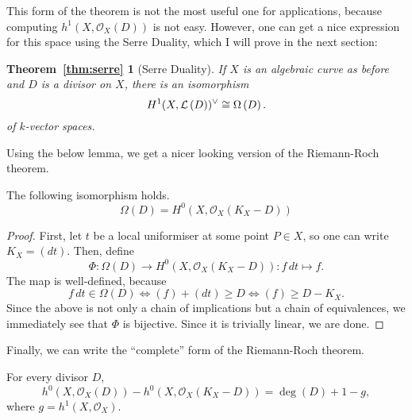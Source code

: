 This form of the theorem is not the most useful one for applications,
because computing $h^{1}(X,\mathscr{O}_X(D))$ is not easy. However, one can
get a nice expression for this space using the Serre Duality, which
I will prove in the next section:
\newtheorem*{thm:serre}{Theorem~\ref{thm:serre}}
\begin{thm:serre}[Serre Duality]
  If $X$ is an algebraic curve as before
  and $D$ is a divisor on $X$, there is an isomorphism
  \[
    H^1(X,\mathcal{L}\left(D\right))^{\vee}\cong \Omega\left(D\right).
  \]
  of $k$-vector spaces.
\end{thm:serre}
Using the below lemma, we get a nicer looking version of the Riemann-Roch theorem.
\begin{lemm}\label{lemm:diffs_dim}
  The following isomorphism holds.
  \[\Omega(D)=H^{0}(X,\mathscr{O}_X(K_{X}-D))\]
\end{lemm}
\begin{proof}
  First, let $t$ be a local uniformiser at some point $P\in X$, so
  one can write $K_{X}=(dt)$. Then, define
  \[
    \Phi\colon\Omega(D)\to H^{0}(X,\mathscr{O}_{X}(K_{X}-D)):f\,dt\mapsto f.
  \]
  The map is well-defined, because
  \[
    f\,dt\in\Omega(D)\iff (f)+(dt)\geq D\iff (f)\geq D-K_{X}.
  \]
  Since the above is not only a chain of implications but a chain of equivalences,
  we immediately see that $\Phi$ is bijective. Since it is trivially linear, we are done.
\end{proof}
Finally, we can write the ``complete'' form of the Riemann-Roch theorem.
\begin{thm}\label{thm:riemann_roch}
  For every divisor $D$,
  \[
    h^{0}(X, \mathscr{O}_X(D))-h^{0}(X, \mathscr{O}_X(K_{X}-D))=\deg(D)+1-g,
  \]
  where $g=h^{1}(X, \mathscr{O}_{X})$.
\end{thm}

